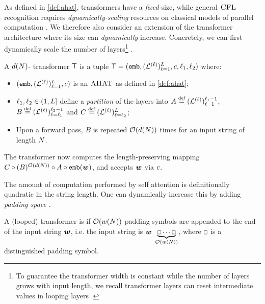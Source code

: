\documentclass{article}
\begin{document}
As defined in \cref{def:ahat}, transformers have a \emph{fixed} size, while general ${\textsc{CFL}}$ recognition requires \emph{dynamically-scaling} resources on classical models of parallel computation \citep{venkateswaran-logcfl}.
We therefore also consider an extension of the transformer architecture where its size can \emph{dynamically} increase.
Concretely, we can first dynamically scale the number of layers\footnote{To guarantee the transformer width is constant while the number of layers grows with input length, we recall transformer layers can reset intermediate values in looping layers \citep{merrill-2025littledepthgoeslong}.}  \citep{merrill-2025littledepthgoeslong}.
\begin{definition}\label{def:looping}
    A $d({{ N}})$- transformer $\tf$ is a tuple $\tf = (\embedFunc, (\tflayer^{(\layerIdx)})_{\layerIdx=1}^{\nLayers}, \funcc, \layerIdx_1, \layerIdx_2)$ where:
    \begin{itemize}[noitemsep,topsep=0pt,leftmargin=15pt,parsep=0pt,partopsep=0pt]
        \item $({\texttt{emb}},({\mathrm{\mathcal{L}}}^{({\ell})})_{{\ell}=1}^{{L}}, {{ c}})$ is an ${{\textsc{AHAT}}}$ as defined in \cref{def:ahat};
        \item ${\ell}_1, {\ell}_2 \in (1,{L}]$ define a \emph{partition} of the layers into $A \defeq (\tflayer^{(\layerIdx)})_{\layerIdx=1}^{\layerIdx_1-1}$, $B \defeq (\tflayer^{(\layerIdx)})_{\layerIdx=\layerIdx_1}^{\layerIdx_2-1}$ and $C \defeq (\tflayer^{(\layerIdx)})_{\layerIdx=\layerIdx_2}^{\nLayers}$;
        \item Upon a forward pass, $B$ is repeated ${{ \mathcal{O}}}(d({{ N}}))$ times for an input string of length ${{ N}}$.
    \end{itemize}
    The transformer now computes the length-preserving mapping $C \circ (B)^{{{ \mathcal{O}}}(d({{ N}}))} \circ A \circ {\texttt{emb}}({{\boldsymbol{w}}})$, and accepts ${{\boldsymbol{w}}}$ via ${{ c}}$. 
\end{definition}

The amount of computation performed by self attention is definitionally quadratic in the string length. 
One can dynamically increase this by adding \emph{padding space}  \citep{merrill2025exactexpressivepowertransformers}.
\begin{definition}\label{def:padding}
    A (looped) transformer is  if ${{ \mathcal{O}}}(w({{ N}}))$ padding symbols are appended to the end of the input string ${{\boldsymbol{w}}}$, i.e. the input string is $\str \ \underbrace{\paddingtoken \cdots \paddingtoken}_{\bigo(w(\idxn))}$, where $\paddingtoken$ is a distinguished padding symbol.
\end{definition}
\end{document}
